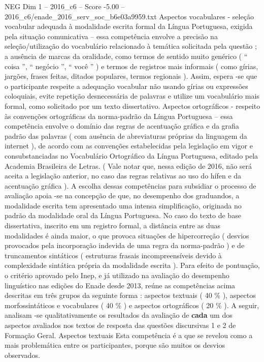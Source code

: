 \begin{textsample}{NEG Dim 1 – 2016\_c6 – Score -5.00 – 2016\_c6/enade\_2016\_serv\_soc\_b6e03a9959.txt}
Aspectos vocabulares - seleção vocabular adequada à modalidade escrita formal da Língua Portuguesa, exigida pela situação comunicativa – essa competência envolve a precisão na seleção/utilização do vocabulário relacionado à temática solicitada pela questão ; a ausência de marcas da oralidade, como termos de sentido muito genérico ( “ coisa ”, “ negócio ”, “ você ” ) e termos de registros mais informais ( como gírias, jargões, frases feitas, ditados populares, termos regionais ).
Assim, espera -se que o participante respeite a adequação vocabular não usando gírias ou expressões coloquiais, evite repetição desnecessária de palavras e utilize um vocabulário mais formal, como solicitado por um texto dissertativo.
Aspectos ortográficos - respeito às convenções ortográficas da norma-padrão da Língua Portuguesa – essa competência envolve o domínio das regras de acentuação gráfica e da grafia padrão das palavras ( com ausência de abreviaturas próprias da linguagem da internet ), de acordo com as convenções estabelecidas pela legislação em vigor e consubstanciadas no Vocabulário Ortográfico da Língua Portuguesa, editado pela Academia Brasileira de Letras. ( Vale notar que, nessa edição de 2016, não será aceita a legislação anterior, no caso das regras relativas ao uso do hífen e da acentuação gráfica ).
A escolha dessas competências para subsidiar o processo de avaliação apoia -se na concepção de que, no desempenho dos graduandos, a modalidade escrita tem apresentado uma intensa simplificação, originada no padrão da modalidade oral da Língua Portuguesa.
No caso do texto de base dissertativa, inscrito em um registro formal, a distância entre as duas modalidades é ainda maior, o que provoca situações de hipercorreção ( desvios provocados pela incorporação indevida de uma regra da norma-padrão ) e de truncamentos sintáticos ( estruturas frasais incompreensíveis devido à complexidade sintática própria da modalidade escrita ).
Para efeito de pontuação, o critério aprovado pelo Inep, e já utilizado na avaliação do desempenho linguístico nas edições do Enade desde 2013, reúne as competências acima descritas em três grupos da seguinte forma : aspectos textuais ( 40 \% ), aspectos morfossintáticos e vocabulares ( 40 \% ) e aspectos ortográficos ( 20 \% ).
A seguir, analisam -se qualitativamente os resultados da avaliação de \textbf{cada} um dos aspectos avaliados nos textos de resposta das questões discursivas 1 e 2 de Formação Geral.
Aspectos textuais Esta competência é a que se revelou como a mais problemática entre os participantes, porque são muitos os desvios observados.

\end{textsample}
